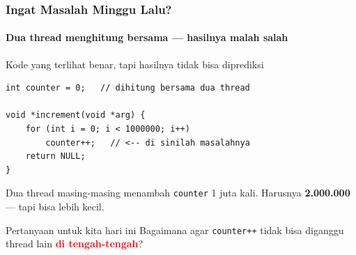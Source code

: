 \documentclass[t,aspectratio=169,xcolor=dvipsnames]{beamer}
\newcommand{\tem}[1]{\textbf{\textcolor{red}{#1}}}
\begin{document}
\begin{frame}[fragile,shrink=3]
    \frametitle{Ingat Masalah Minggu Lalu?}
    \framesubtitle{Dua thread menghitung bersama — hasilnya malah salah}

    \begin{center}
    \begin{alertblock}{Kode yang terlihat benar, tapi hasilnya tidak bisa diprediksi}
\begin{lstlisting}[basicstyle=\ttfamily\scriptsize]
int counter = 0;   // dihitung bersama dua thread

void *increment(void *arg) {
    for (int i = 0; i < 1000000; i++)
        counter++;   // <-- di sinilah masalahnya
    return NULL;
}
\end{lstlisting}
    \end{alertblock}
    \end{center}

    \footnotesize
    Dua thread masing-masing menambah \texttt{counter} 1 juta kali.
    Harusnya \textbf{2.000.000} — tapi bisa lebih kecil.

    \begin{exampleblock}{Pertanyaan untuk kita hari ini}
        \centering
        Bagaimana agar \texttt{counter++} tidak bisa diganggu thread lain \tem{di tengah-tengah}?
    \end{exampleblock}
\end{frame}
\end{document}
